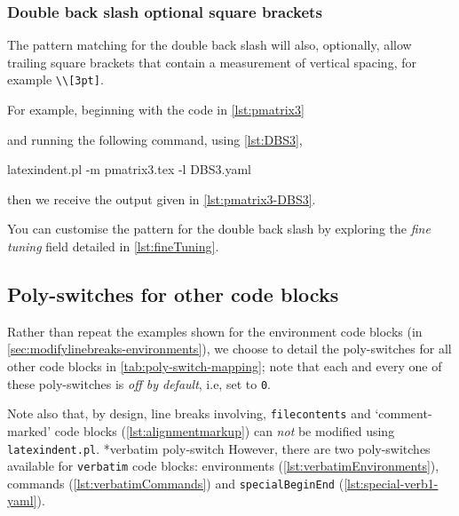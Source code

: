 \subsubsection{Double back slash optional square brackets}
	The pattern matching for the double back slash will also, optionally, allow trailing
	square brackets that contain a measurement of vertical spacing, for example
	\lstinline!\\[3pt]!.

	For example, beginning with the code in \cref{lst:pmatrix3}


	and running the following command, using \cref{lst:DBS3},
	\begin{commandshell}
latexindent.pl -m pmatrix3.tex -l DBS3.yaml
\end{commandshell}
	then we receive the output given in \cref{lst:pmatrix3-DBS3}.


	You can customise the pattern for the double back slash by exploring the
	\emph{fine tuning} field detailed in \vref{lst:fineTuning}.

\subsection{Poly-switches for other code blocks}
	Rather than repeat the examples shown for the environment code blocks (in
	\vref{sec:modifylinebreaks-environments}), we choose to detail the poly-switches for all other code
	blocks in \cref{tab:poly-switch-mapping}; note that each and every one of these
	poly-switches is \emph{off by default}, i.e, set to \texttt{0}.

	Note also that, by design, line breaks involving, \texttt{filecontents} and
	`comment-marked' code blocks (\vref{lst:alignmentmarkup}) can
	\emph{not} be modified using
	\texttt{latexindent.pl}.%
	*{verbatim poly-switch} However, there are two poly-switches available for
	\texttt{verbatim} code blocks: environments (\vref{lst:verbatimEnvironments}),
	commands (\vref{lst:verbatimCommands}) and \texttt{specialBeginEnd} (\vref{lst:special-verb1-yaml}).

